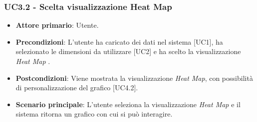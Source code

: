 \subsubsection{UC3.2 - Scelta visualizzazione Heat Map}
\begin{itemize}
	\item \textbf{Attore primario}: Utente.
	\item \textbf{Precondizioni}: L'utente ha caricato dei dati nel sistema [UC1], ha selezionato le dimensioni da utilizzare [UC2] e ha scelto la visualizzazione \textit{Heat Map} .
	\item \textbf{Postcondizioni}: Viene mostrata la visualizzazione \textit{Heat Map}, con possibilità di personalizzazione del grafico [UC4.2].
	\item \textbf{Scenario principale}: L'utente seleziona la visualizzazione \textit{Heat Map} e il sistema ritorna un grafico con cui si può interagire.

\end{itemize}
